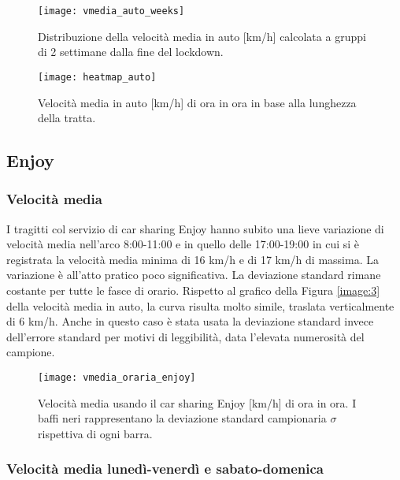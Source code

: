 \begin{figure}
	\centering
	\texttt{[image: vmedia\_auto\_weeks]}
	\caption{Distribuzione della velocità media in auto [km/h] calcolata a gruppi di 2 settimane dalla fine del lockdown.}
	\label{image:27}
\end{figure}

\begin{figure}[H]
	\centering
	\texttt{[image: heatmap\_auto]}
	\caption{Velocità media in auto [km/h] di ora in ora in base alla lunghezza della tratta.}
	\label{image:6}
\end{figure}





\pagebreak

\subsection{Enjoy}

\subsubsection{Velocità media}

I tragitti col servizio di car sharing Enjoy hanno subito una lieve variazione di velocità media nell'arco 8:00-11:00 e in quello delle 17:00-19:00 in cui si è registrata la velocità media minima di 16 km/h e di 17 km/h di massima. La variazione è all'atto pratico poco significativa. La deviazione standard rimane costante per tutte le fasce di orario. Rispetto al grafico della Figura \ref{image:3} della velocità media in auto, la curva risulta molto simile, traslata verticalmente di 6 km/h. Anche in questo caso è stata usata la deviazione standard invece dell'errore standard per motivi di leggibilità, data l'elevata numerosità del campione.

\begin{figure}[H]
	\centering
	\texttt{[image: vmedia\_oraria\_enjoy]}
	\caption{Velocità media usando il car sharing Enjoy [km/h] di ora in ora.  I baffi neri rappresentano la deviazione standard campionaria $\sigma$ rispettiva di ogni barra.}
	\label{image:7}
\end{figure}

\subsubsection{Velocità media lunedì-venerdì e sabato-domenica}

